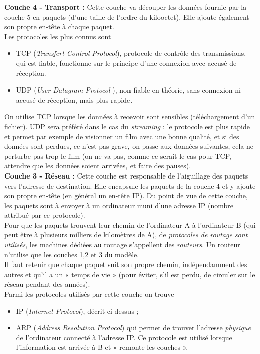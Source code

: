 \textbf{Couche 4 - Transport :} Cette couche va découper les données fournie par la couche 5 en paquets (d'une taille de l'ordre du kilooctet). Elle ajoute également son propre en-tête à chaque paquet.\\
          Les protocoles les plus connus sont
          \begin{itemize}
              \item 	TCP (\textit{Transfert Control Protocol}), protocole de contrôle des transmissions, qui est fiable, fonctionne sur le principe d'une connexion avec accusé de réception.
              \item 	UDP (\textit{User Datagram Protocol} ), non fiable en théorie, sans connexion ni accusé de réception, mais plus rapide.
          \end{itemize}
          On utilise TCP lorsque les données à recevoir sont sensibles (téléchargement d'un fichier). UDP sera préféré dans le cas du \textit{streaming} : le protocole est plus rapide et permet par exemple de visionner un film avec une bonne qualité, et si des données sont perdues, ce n'est pas grave, on passe aux données suivantes, cela ne perturbe pas trop le film (on ne va pas, comme ce serait le cas pour TCP, attendre que les données soient arrivées, et faire des pauses).\\

\textbf{Couche 3 - Réseau :} Cette  couche est responsable de l'aiguillage des paquets vers l'adresse de destination. Elle encapsule les paquets de la couche 4 et y ajoute son propre en-tête (en général un en-tête IP). Du point de vue de cette couche, les paquets sont à envoyer à un ordinateur muni d'une adresse IP (nombre attribué par ce protocole).\\ Pour que les paquets trouvent leur chemin de l'ordinateur A à l'ordinateur B (qui peut être à plusieurs milliers de kilomètres de A), de \textit{protocoles de routage sont utilisés}, les machines dédiées au routage s'appellent des \textit{routeurs}. Un routeur n'utilise que les couches 1,2 et 3 du modèle.\\
          Il faut retenir que chaque paquet suit son propre chemin, indépendamment des autres et qu'il a un « temps de vie » (pour éviter, s'il est perdu, de circuler sur le réseau pendant des années).\\
          Parmi les protocoles utilisés par cette couche on trouve
          \begin{itemize}
              \item 	IP (\textit{Internet Protocol}), décrit ci-dessus ;
              \item 	ARP (\textit{Address Resolution Protocol}) qui permet de trouver l'adresse \textit{physique} de l'ordinateur connecté à l'adresse IP. Ce protocole est utilisé lorsque l'information est arrivée à B et « remonte les couches ».\\
          \end{itemize}

